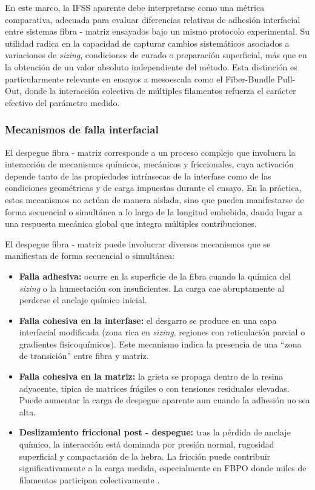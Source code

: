 En este marco, la IFSS aparente debe interpretarse como una métrica comparativa, adecuada para
evaluar diferencias relativas de adhesión interfacial entre sistemas fibra - matriz ensayados bajo un
mismo protocolo experimental. Su utilidad radica en la capacidad de capturar cambios sistemáticos
asociados a variaciones de \textit{sizing}, condiciones de curado o preparación superficial, más que
en la obtención de un valor absoluto independiente del método. Esta distinción es particularmente
relevante en ensayos a mesoescala como el Fiber-Bundle Pull-Out, donde la interacción colectiva de
múltiples filamentos refuerza el carácter efectivo del parámetro medido.

\subsubsection{Mecanismos de falla interfacial}

El despegue fibra - matriz corresponde a un proceso complejo que involucra la interacción de
mecanismos químicos, mecánicos y friccionales, cuya activación depende tanto de las propiedades
intrínsecas de la interfase como de las condiciones geométricas y de carga impuestas durante el
ensayo. En la práctica, estos mecanismos no actúan de manera aislada, sino que pueden manifestarse
de forma secuencial o simultánea a lo largo de la longitud embebida, dando lugar a una respuesta
mecánica global que integra múltiples contribuciones.

El despegue fibra - matriz puede involucrar diversos mecanismos que se manifiestan de forma secuencial
o simultánea:

\begin{itemize}
    \item \textbf{Falla adhesiva:} ocurre en la superficie de la fibra cuando la química del
    \textit{sizing} o la humectación son insuficientes. La carga cae abruptamente al perderse el
    anclaje químico inicial.

    \item \textbf{Falla cohesiva en la interfase:} el desgarro se produce en una capa interfacial
    modificada (zona rica en \textit{sizing}, regiones con reticulación parcial o gradientes
    fisicoquímicos). Este mecanismo indica la presencia de una ``zona de transición'' entre fibra y
    matriz.

    \item \textbf{Falla cohesiva en la matriz:} la grieta se propaga dentro de la resina adyacente,
    típica de matrices frágiles o con tensiones residuales elevadas. Puede aumentar la carga de
    despegue aparente aun cuando la adhesión no sea alta.

    \item \textbf{Deslizamiento friccional post - despegue:} tras la pérdida de anclaje químico,
    la interacción está dominada por presión normal, rugosidad superficial y compactación de la hebra. La
    fricción puede contribuir significativamente a la carga medida, especialmente en FBPO donde miles
    de filamentos participan colectivamente \cite{DeLeon2022}.
\end{itemize}

